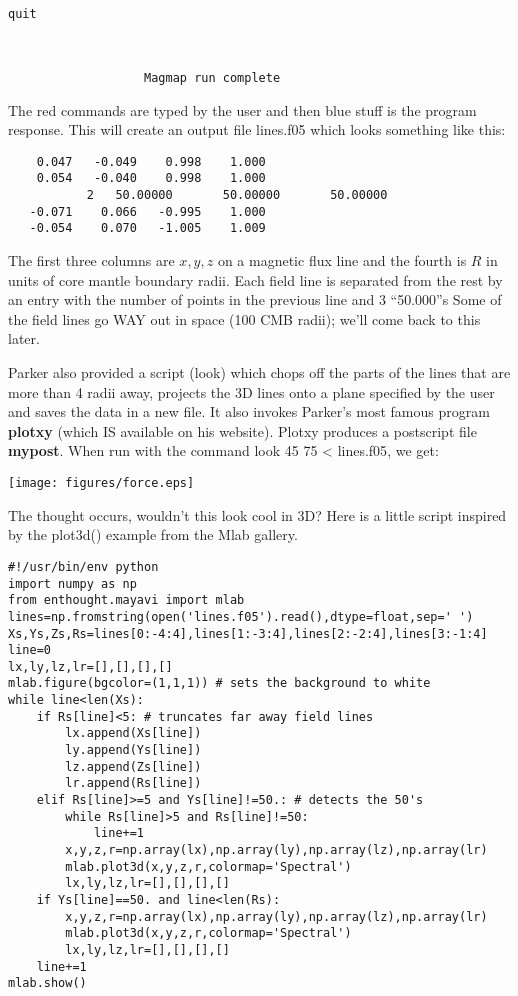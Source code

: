 {\singlespacing \color{red}\begin{verbatim}
quit
\end{verbatim}}

{\singlespacing \color{blue}\begin{verbatim}


                   Magmap run complete

\end{verbatim}}


\noindent  The red commands are typed by the user and then blue stuff is the program response.  This will create an output file {\color{blue}lines.f05} which looks something like this:
 
{\singlespacing \color{blue} \begin{verbatim}
    0.047   -0.049    0.998    1.000
    0.054   -0.040    0.998    1.000
           2   50.00000       50.00000       50.00000    
   -0.071    0.066   -0.995    1.000
   -0.054    0.070   -1.005    1.009
\end{verbatim}}

The first three columns are $x,y,z$ on a magnetic flux line and the fourth is $R$ in units of core mantle boundary radii. 
Each field line is separated from the rest by an entry with the number of points in the previous line and 3 ``50.000''s
Some of the field lines go WAY out in space (100 CMB radii); we'll come back to this later.

 Parker also provided a script ({\color{blue}look}) which chops off the parts of the lines that are more than 4 radii away, projects the 3D lines onto a plane specified by the user and saves the data in a new file.
It also invokes Parker's most famous program {\bf plotxy} (which IS available on his website). Plotxy produces a postscript file {\bf mypost}.  When run with the command {\color{blue}look 45 75 < lines.f05}, we get: 

\texttt{[image: figures/force.eps]}

The thought occurs, wouldn't this look cool in 3D? Here is a little script inspired by the {\color{blue}plot3d()} example from the {\color{blue}Mlab} gallery.  

{\singlespacing \color{blue} \begin{verbatim}
#!/usr/bin/env python
import numpy as np
from enthought.mayavi import mlab
lines=np.fromstring(open('lines.f05').read(),dtype=float,sep=' ')
Xs,Ys,Zs,Rs=lines[0:-4:4],lines[1:-3:4],lines[2:-2:4],lines[3:-1:4]
line=0
lx,ly,lz,lr=[],[],[],[]
mlab.figure(bgcolor=(1,1,1)) # sets the background to white
while line<len(Xs):
    if Rs[line]<5: # truncates far away field lines
        lx.append(Xs[line])
        ly.append(Ys[line])
        lz.append(Zs[line])
        lr.append(Rs[line])
    elif Rs[line]>=5 and Ys[line]!=50.: # detects the 50's
        while Rs[line]>5 and Rs[line]!=50:
            line+=1
        x,y,z,r=np.array(lx),np.array(ly),np.array(lz),np.array(lr)
        mlab.plot3d(x,y,z,r,colormap='Spectral') 
        lx,ly,lz,lr=[],[],[],[]
    if Ys[line]==50. and line<len(Rs):
        x,y,z,r=np.array(lx),np.array(ly),np.array(lz),np.array(lr)
        mlab.plot3d(x,y,z,r,colormap='Spectral') 
        lx,ly,lz,lr=[],[],[],[]
    line+=1
mlab.show()
\end{verbatim}}

